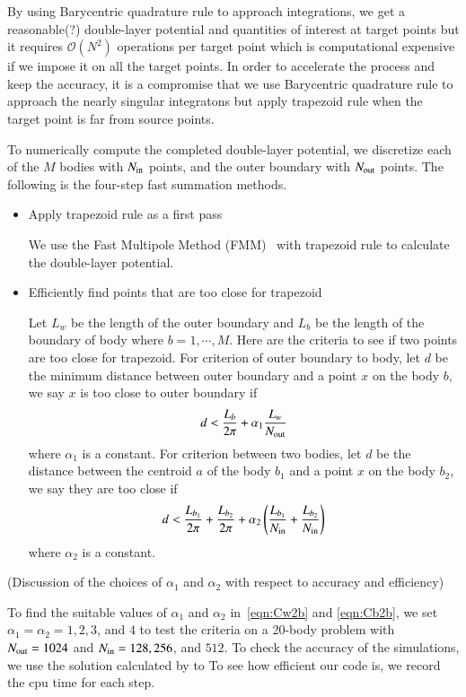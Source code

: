 \documentclass[preprint, 10pt]{elsarticle}
\begin{document}
{\color{red}
By using Barycentric quadrature rule to approach integrations, we get a reasonable(?) double-layer potential and quantities of interest at target points but it requires $\mathcal{O}(N^2)$ operations per target point which is computational expensive if we impose it on all the target points. In order to accelerate the process and keep the accuracy, it is a compromise that we use Barycentric quadrature rule to approach the nearly singular integratons but apply trapezoid rule when the target point is far from source points. 


To numerically compute the completed double-layer potential, we discretize each of the $M$ bodies with  $N_{\mathrm{in}}$ points, and the outer boundary with $N_{\mathrm{out}}$ points. The following is the four-step fast summation methods.
}
\begin{itemize}
  \item Apply trapezoid rule as a first pass

{\color{red} We use the Fast Multipole Method (FMM)~\cite{gre-rok1987, gre-gre-may1992} with trapezoid rule to calculate the double-layer potential.
}
  \item Efficiently find points that are too close for trapezoid

{\color{red}
 Let $L_w$ be the length of the outer boundary and $L_{b}$ be the length of the boundary of body where $b=1, \cdots, M$. Here are the criteria to see if two points are too close for trapezoid. For criterion of outer boundary to body,  let $d$ be the minimum distance between outer boundary and a point $x$ on the body $b$, we say $x$ is too close to outer boundary if
\begin{equation}\label{eqn:Cw2b}
d<\frac{L_{b}}{2\pi} + \alpha_1\frac{L_w}{N_{\mathrm{out}}}
\end{equation}
where $\alpha_1$ is a constant. 
For criterion between two bodies, let $d$ be the distance between the centroid $a$ of the body $b_1$ and a point $x$ on the body $b_2$, we say they are too close if
\begin{equation}\label{eqn:Cb2b}
d<\frac{L_{b_1}}{2\pi}+\frac{L_{b_2}}{2\pi}+\alpha_2\left(\frac{L_{b_1}}{N_{\mathrm{in}}}+\frac{L_{b_2}}{N_{\mathrm{in}}}\right)
\end{equation}
where $\alpha_2$ is a constant. 

}
\end{itemize}
{\color{red}  (Discussion of the choices of $\alpha_1$ and $\alpha_2$ with respect to accuracy and  efficiency)

To find the suitable values of $\alpha_1$ and $\alpha_2$ in~\eqref{eqn:Cw2b} and \eqref{eqn:Cb2b}, we set $\alpha_1=\alpha_2=1, 2, 3$, and $4$ to test the criteria on a 20-body problem with $N_{\mathrm{out}} = 1024$ and $N_{\mathrm{in}} = 128, 256$, and $512$. To check the accuracy of the simulations, we use the solution calculated by  to 
To see how efficient our code is, we record the cpu time for each step.

}
\end{document}
